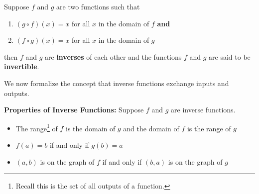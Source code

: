 \smallskip

\colorbox{ResultColor}{\bbm

\begin{defn} \label{inversefunctiondefn} Suppose $f$ and $g$ are two functions such that

\begin{enumerate}

\item  $(g \circ f)(x) = x$ for all $x$ in the domain of $f$ \textbf{and}

\item  $(f \circ g)(x) = x$ for all $x$ in the domain of $g$

\end{enumerate}

then $f$ and $g$ are \textbf{inverses} of each other and the functions $f$ and $g$ are said to be \textbf{invertible}. 

\end{defn}
\ebm}

\smallskip

We now formalize the concept that inverse functions exchange inputs and outputs.
\smallskip

\colorbox{ResultColor}{\bbm

\begin{thm}\textbf{Properties of Inverse Functions:} Suppose $f$ and $g$ are inverse functions.  

\begin{itemize}

\item  The range\footnote{Recall this is the set of all outputs of a function.} of $f$ is the domain of $g$ and the domain of $f$ is the range of $g$

\item  $f(a) = b$ if and only if $g(b) = a$

\item  $(a,b)$ is on the graph of $f$ if and only if $(b,a)$ is on the graph of $g$

\end{itemize}


\label{inversefunctionprops}

\end{thm}
\ebm}

\smallskip

